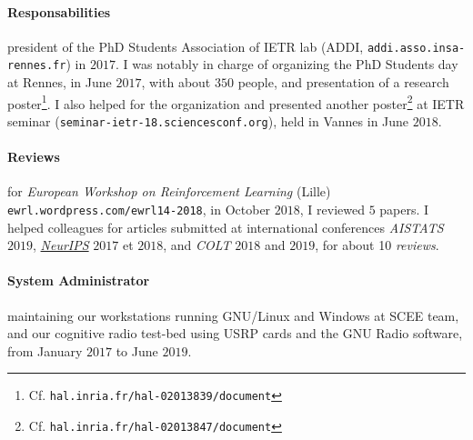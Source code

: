 \paragraph{Responsabilities}
    president of the PhD Students Association of IETR lab (ADDI, \texttt{addi.asso.insa-rennes.fr}) in $2017$.
    I was notably in charge of organizing the PhD Students day at Rennes, in June $2017$, with about $350$ people, and presentation of a research poster\footnote{Cf. \texttt{hal.inria.fr/hal-02013839/document}}.
    I also helped for the organization and presented another poster\footnote{Cf. \texttt{hal.inria.fr/hal-02013847/document}} at IETR seminar (\texttt{seminar-ietr-18.sciencesconf.org}), held in Vannes in June $2018$.

\paragraph{Reviews}
	for \emph{European Workshop on Reinforcement Learning} (Lille) \texttt{ewrl.wordpress.com/ewrl14-2018}, in October $2018$, I reviewed $5$ papers.
	I helped colleagues for articles submitted at international conferences \emph{AISTATS} $2019$, \href{https://nips.cc/Conferences/2018/}{\emph{NeurIPS}} $2017$ et $2018$, and \emph{COLT} $2018$ and $2019$, for about 10 \emph{reviews}.

\paragraph{System Administrator}
	maintaining our workstations running GNU/Linux and Windows
	at SCEE team,
	and our cognitive radio test-bed using USRP cards and the GNU Radio software,
	from January $2017$ to June $2019$.

